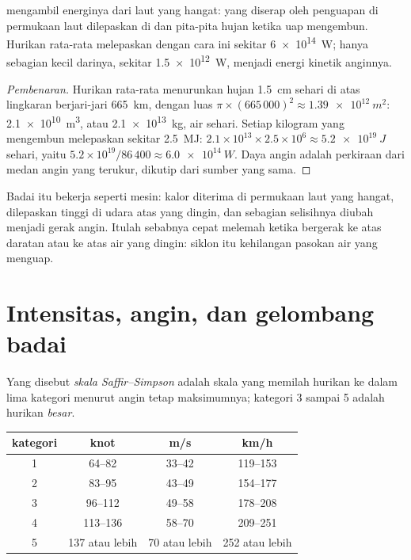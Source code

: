 \begin{proposition}\label{prop:g10:storms-and-cyclones:energy}
 mengambil energinya dari laut yang hangat:  yang
diserap oleh penguapan di permukaan laut dilepaskan di  dan
pita-pita hujan ketika uap mengembun. Hurikan rata-rata melepaskan dengan cara
ini sekitar \qty{6e14}{W}; hanya sebagian kecil darinya, sekitar
\qty{1.5e12}{W}, menjadi energi kinetik anginnya.
\end{proposition}

\begin{proof}[Pembenaran]
Hurikan rata-rata menurunkan hujan \qty{1.5}{cm} sehari di atas lingkaran
berjari-jari \qty{665}{km}, dengan luas $\pi \times (665\,000)^2 \approx
\qty{1.39e12}{m^2}$: \qty{2.1e10}{m^3}, atau \qty{2.1e13}{kg}, air sehari.
Setiap kilogram yang mengembun melepaskan sekitar \qty{2.5}{MJ}: $2.1\times10^{13}
\times 2.5\times10^6 \approx \qty{5.2e19}{J}$ sehari, yaitu
$5.2\times10^{19}/86\,400 \approx \qty{6.0e14}{W}$. Daya angin adalah
perkiraan dari medan angin yang terukur, dikutip dari sumber yang sama.
\end{proof}

Badai itu bekerja seperti mesin: kalor diterima di permukaan laut yang hangat,
dilepaskan tinggi di udara atas yang dingin, dan sebagian selisihnya diubah
menjadi gerak angin. Itulah sebabnya  cepat melemah ketika
bergerak ke atas daratan atau ke atas air yang dingin: siklon itu kehilangan
pasokan air yang menguap.

\section{Intensitas, angin, dan gelombang badai}

\begin{definition}\label{def:g10:storms-and-cyclones:scale}
Yang disebut \emph{skala Saffir--Simpson} adalah
skala yang memilah hurikan ke dalam lima kategori menurut angin tetap
maksimumnya; kategori 3 sampai 5 adalah hurikan \emph{besar}.
\end{definition}

\begin{center}
\small
\begin{tabular}{cccc}
\hline
kategori & knot & \unit{m/s} & \unit{km/h} \\
\hline
1 & 64--82 & 33--42 & 119--153 \\
2 & 83--95 & 43--49 & 154--177 \\
3 & 96--112 & 49--58 & 178--208 \\
4 & 113--136 & 58--70 & 209--251 \\
5 & 137 atau lebih & 70 atau lebih & 252 atau lebih \\
\hline
\end{tabular}
\end{center}

